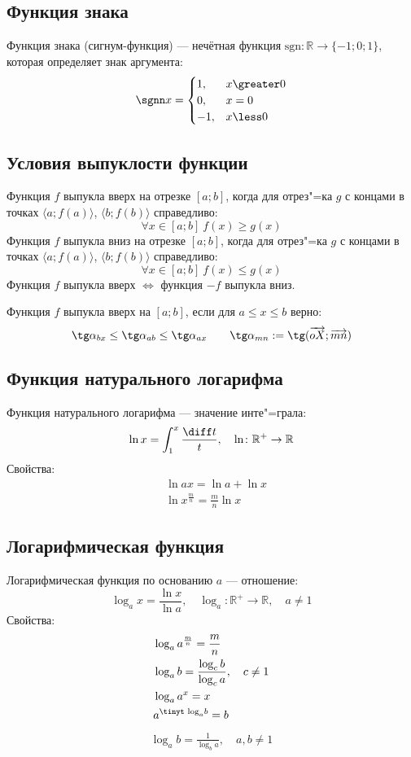 \subsection{Функция знака}

{\bold Функция знака} {\ital (сигнум-функция)} --- нечётная функция $\text{sgn}\colon
\mathbb{R}\to\{-1;0;1\}$, которая определяет знак аргумента:
$$\sgnn x=\begin{cases}
1, &x\greater 0\\
0, &x=0\\
-1, &x\less 0
\end{cases}$$

\subsection{Условия выпуклости функции}

Функция $f$ {\ital выпукла} {\bold вверх} на отрезке $[a;b]$, когда для отрез"=ка $g$
с концами в точках $\langle a;f(a)\rangle$, $\langle b;f(b)\rangle$ справедливо:
$$\forall x\in[a;b]\ f(x)\geq g(x)$$
Функция $f$ {\ital выпукла} {\bold вниз} на отрезке $[a;b]$, когда для отрез"=ка $g$
с концами в точках $\langle a;f(a)\rangle$, $\langle b;f(b)\rangle$ справедливо:
$$\forall x\in[a;b]\ f(x)\leq g(x)$$
Функция $f$ выпукла вверх $\iff$ функция $-f$ выпукла вниз.

Функция $f$ выпукла вверх на $[a;b]$, если для $a\leq x\leq b$ верно:
$$\tg\alpha_{bx}\leq\tg\alpha_{ab}\leq\tg\alpha_{ax}\quad\quad\tg\alpha_{mn}:=\tg
(\overrightarrow{oX};\overrightarrow{mn})$$

\subsection{Функция натурального логарифма}

{\bold Функция натурального логарифма} --- значение инте"=грала:
$$\ln x=\int_1^x\frac{\diff t}{t},\quad\ln\colon\mathbb{R}^+\to\mathbb{R}$$
Свойства:
\begin{align*}
&\ln ax=\ln a+\ln x\\
&\ln x^{\frac{m}{n}}=\frac{m}{n}\ln x
\end{align*}

\subsection{Логарифмическая функция}

{\bold Логарифмическая функция} по основанию $a$ --- отношение:
$$\log_ax=\frac{\ln x}{\ln a},\quad\log_a\colon\mathbb{R}^+\to\mathbb{R},\quad a\neq 1$$
Свойства:
\begin{align*}
&\log_aa^{\frac{m}{n}}=\frac{m}{n}\\
&\log_ab=\frac{\log_cb}{\log_ca},\quad c\neq 1\\
&\log_aa^x=x\\
&a^{\text{\tinyt log}_ab}=b
\end{align*}
\begin{align*}
\log_ab=\frac{1}{\log_ba},\quad a,b\neq 1
\end{align*}
